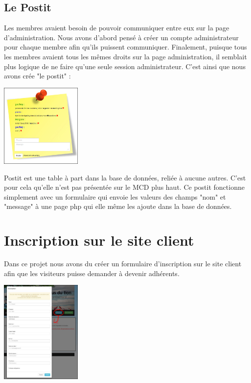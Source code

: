 \documentclass[11pt,a4paper,titlepage]{report}
\begin{document}
\subsection{Le Postit}
Les membres avaient besoin de pouvoir communiquer entre eux sur la page d'administration. Nous avons d'abord pensé à créer un compte administrateur pour chaque membre afin qu'ils puissent communiquer. Finalement, puisque tous les membres avaient tous les mêmes droits sur la page administration, il semblait plus logique de ne faire qu'une seule session administrateur. C'est ainsi que nous avons crée "le postit" :   
\begin{center}
\includegraphics[width=0.3\textwidth]{postit.jpg}~
\end{center}

Postit est une table à part dans la base de données, reliée à aucune autres. C'est pour cela qu'elle n'est pas présentée sur le MCD plus haut.
Ce postit fonctionne simplement avec un formulaire qui envoie les valeurs des champs "nom" et "message" à une page php qui elle même les ajoute dans la base de données. 

\section{Inscription sur le site client}
Dans ce projet nous avons du créer un formulaire d'inscription sur le site client afin que les visiteurs puisse demander à devenir adhérents. 

\begin{center}
\includegraphics[width=0.3\textwidth]{inscr.jpg}~
\end{center}
\end{document}
